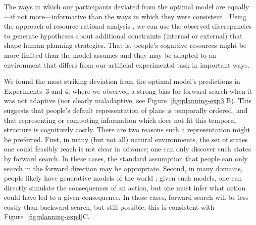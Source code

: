 The ways in which our participants deviated from the optimal model are equally---if not more---informative than the ways in which they were consistent \citep{norris2021more}. Using the approach of resource-rational analysis \citep{griffiths2015rational,lieder2020resourcerational}, we can use the observed discrepancies to generate hypotheses about additional constraints (internal or external) that shape human planning strategies. That is, people's cognitive resources might be more limited than the model assumes and they may be adapted to an environment that differs from our artificial experimental task in important ways.

We found the most striking deviation from the optimal model's predictions in Experiments~3 and 4, where we observed a strong bias for forward search when it was not adaptive (nor clearly maladaptive, see Figure~\ref{fig:planning-exp3}B). 
This suggests that people's default representation of plans is temporally ordered, and that representing or computing information which does not fit this temporal structure is cognitively costly.
There are two reasons such a representation might be preferred.
First, in many (but not all) natural environments, the set of states one could feasibly reach is not clear in advance; one can only discover such states by forward search. In these cases, the standard assumption that people can only search in the forward direction \citep{keramati2016adaptive,vanopheusden2017computational,huys2012bonsai,snider2015prospective} may be appropriate. Second, in many domains, people likely have generative models of the world \citep{battaglia2013simulation,jara-ettinger2016naive}; given such models, one can directly simulate the consequences of an action, but one must infer what action could have led to a given consequence. In these cases, forward search will be less costly than backward search, but still possible; this is consistent with Figure~\ref{fig:planning-exp4}C.


